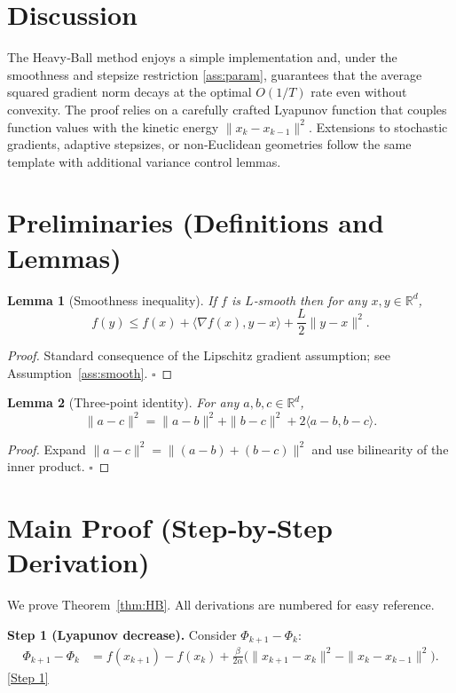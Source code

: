 \documentclass[11pt]{article}
\newtheorem{lemma}{Lemma}
\newcommand{\R}{\mathbb{R}}
\begin{document}
\section*{Discussion}
The Heavy‑Ball method enjoys a simple implementation and, under the
smoothness and stepsize restriction \eqref{ass:param}, guarantees that the
average squared gradient norm decays at the optimal $O(1/T)$ rate even
without convexity.  The proof relies on a carefully crafted Lyapunov function
that couples function values with the kinetic energy $\|x_{k}-x_{k-1}\|^{2}$.
Extensions to stochastic gradients, adaptive stepsizes, or
non‑Euclidean geometries follow the same template with additional variance
control lemmas.

\section*{Preliminaries (Definitions and Lemmas)}
\begin{lemma}[Smoothness inequality]\label{lem:smooth}
If $f$ is $L$‑smooth then for any $x,y\in\R^{d}$,
\[
f(y)\le f(x)+\langle\nabla f(x),y-x\rangle+\frac{L}{2}\|y-x\|^{2}.
\tag{L1}
\]
\end{lemma}
\begin{proof}
Standard consequence of the Lipschitz gradient assumption; see
Assumption~\ref{ass:smooth}.  $\square$
\end{proof}
\begin{lemma}[Three‑point identity]\label{lem:3pt}
For any $a,b,c\in\R^{d}$,
\[
\|a-c\|^{2}= \|a-b\|^{2}+ \|b-c\|^{2}+2\langle a-b,b-c\rangle .
\tag{L2}
\]
\end{lemma}
\begin{proof}
Expand $\|a-c\|^{2}=\|(a-b)+(b-c)\|^{2}$ and use bilinearity of the inner product.
$\square$
\end{proof}
\section*{Main Proof (Step‑by‑Step Derivation)}
We prove Theorem~\ref{thm:HB}.  All derivations are numbered for easy reference.

\medskip
\noindent\textbf{Step 1 (Lyapunov decrease).}  
Consider $\Phi_{k+1}-\Phi_{k}$:
\begin{align}
\Phi_{k+1}-\Phi_{k}
&= f(x_{k+1})-f(x_{k})+\frac{\beta}{2\alpha}
   \bigl(\|x_{k+1}-x_{k}\|^{2}-\|x_{k}-x_{k-1}\|^{2}\bigr). \label{eq:phi_diff}
\end{align}
\underline{[Step 1]}
\end{document}
